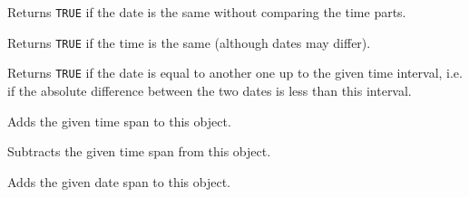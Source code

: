 Returns {\tt TRUE} if the date is the same without comparing the time parts.

\label{wxdatetimeissametime}


Returns {\tt TRUE} if the time is the same (although dates may differ).

\label{wxdatetimeisequalupto}


Returns {\tt TRUE} if the date is equal to another one up to the given time
interval, i.e. if the absolute difference between the two dates is less than
this interval.


\label{wxdatetimeaddts}




Adds the given time span to this object.

\label{wxdatetimesubtractts}




Subtracts the given time span from this object.

\label{wxdatetimeaddds}




Adds the given date span to this object.

\label{wxdatetimesubtractds}

